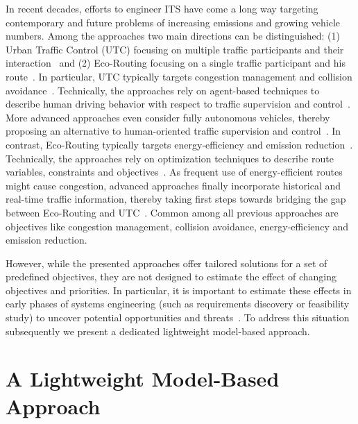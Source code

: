 \documentclass[conference]{../cls/IEEEtran}
\begin{document}
In recent decades, efforts to engineer ITS have come a long way targeting contemporary and future problems of increasing emissions and growing vehicle numbers. Among the approaches two main directions can be distinguished: (1) Urban Traffic Control (UTC) focusing on multiple traffic participants and their interaction~\cite{Chen2010,Dresner2008} and (2) Eco-Routing focusing on a single traffic participant and his route~\cite{Ericsson2006,Boriboonsomsin2012}. In particular, UTC typically targets congestion management and collision avoidance~\cite{Chen2010}. Technically, the approaches rely on agent-based techniques to describe human driving behavior with respect to traffic supervision and control~\cite{Chen2010}. More advanced approaches even consider fully autonomous vehicles, thereby proposing an alternative to human-oriented traffic supervision and control~\cite{Dresner2008}. In contrast, Eco-Routing typically targets energy-efficiency and emission reduction~\cite{Ericsson2006}. Technically, the approaches rely on optimization techniques to describe route variables, constraints and objectives~\cite{Ericsson2006}. As frequent use of energy-efficient routes might cause congestion, advanced approaches finally incorporate historical and real-time traffic information, thereby taking first steps towards bridging the gap between Eco-Routing and UTC~\cite{Boriboonsomsin2012}. Common among all previous approaches are objectives like congestion management, collision avoidance, energy-efficiency and emission reduction.

However, while the presented approaches offer tailored solutions for a set of predefined objectives, they are not designed to estimate the effect of changing objectives and priorities. In particular, it is important to estimate these effects in early phases of systems engineering (such as requirements discovery or feasibility study) to uncover potential opportunities and threats~\cite{Whitten2005}. To address this situation subsequently we present a dedicated lightweight model-based approach.

\section{A Lightweight Model-Based Approach}
\label{sec:approach}
\end{document}
